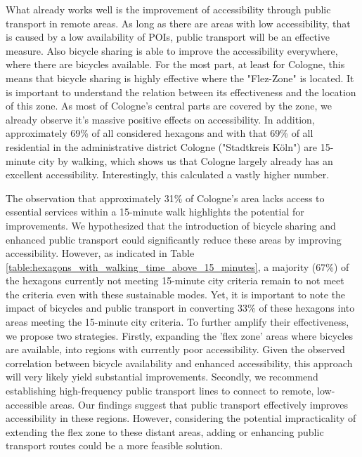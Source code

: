 What already works well is the improvement of accessibility through public transport in remote areas.
As long as there are areas with low accessibility, that is caused by a low availability of POIs, public transport will be an effective measure.
Also bicycle sharing is able to improve the accessibility everywhere, where there are bicycles available.
For the most part, at least for Cologne, this means that bicycle sharing is highly effective where the "Flez-Zone" is located.
It is important to understand the relation between its effectiveness and the location of this zone.
As most of Cologne's central parts are covered by the zone, we already observe it's massive positive effects on accessibility.
In addition, approximately 69\% of all considered hexagons and with that 69\% of all residential in the administrative district Cologne ("Stadtkreis Köln") are 15-minute city by walking, which shows us that Cologne largely already has an excellent accessibility.
Interestingly, this \cite{nicolettiDisadvantagedCommunitiesHave2023} calculated a vastly higher number. 

The observation that approximately 31\% of Cologne's area lacks access to essential services within a 15-minute walk highlights the potential for improvements.
We hypothesized that the introduction of bicycle sharing and enhanced public transport could significantly reduce these areas by improving accessibility.
However, as indicated in Table \ref{table:hexagons_with_walking_time_above_15_minutes}, a majority (67\%) of the hexagons currently not meeting 15-minute city criteria remain to not meet the criteria even with these sustainable modes.
Yet, it is important to note the impact of bicycles and public transport in converting 33\% of these hexagons into areas meeting the 15-minute city criteria.
To further amplify their effectiveness, we propose two strategies.
Firstly, expanding the 'flex zone' areas where bicycles are available, into regions with currently poor accessibility. 
Given the observed correlation between bicycle availability and enhanced accessibility, this approach will very likely yield substantial improvements.
Secondly, we recommend establishing high-frequency public transport lines to connect to remote, low-accessible areas. 
Our findings suggest that public transport effectively improves accessibility in these regions. 
However, considering the potential impracticality of extending the flex zone to these distant areas, adding or enhancing public transport routes could be a more feasible solution.

